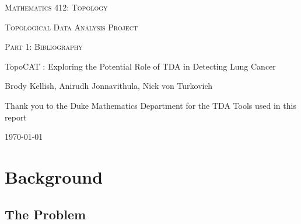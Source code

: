 \documentclass[12pt]{report}
\begin{document}

\begin{titlepage}
	\centering
	
{\scshape\LARGE Mathematics 412: Topology \par}
	{\scshape\Large Topological Data Analysis Project\par}
	{\scshape\Large Part 1: Bibliography\par}
	\vspace{1.5cm}
	{\Large TopoCAT : Exploring the Potential Role of TDA in Detecting Lung Cancer\par}
	{\vspace{2cm}}
	
	{\normalsize Brody Kellish, Anirudh Jonnavithula, Nick von Turkovich\par}
	\vspace{1.5cm}
	{\normalsize Thank you to the Duke Mathematics Department for the TDA Tools used in this report\par}
	\vfill


	{\large \today\par}
\end{titlepage}
\newpage

\tableofcontents{}

\part{Background}
\chapter{The Problem}
\end{document}
